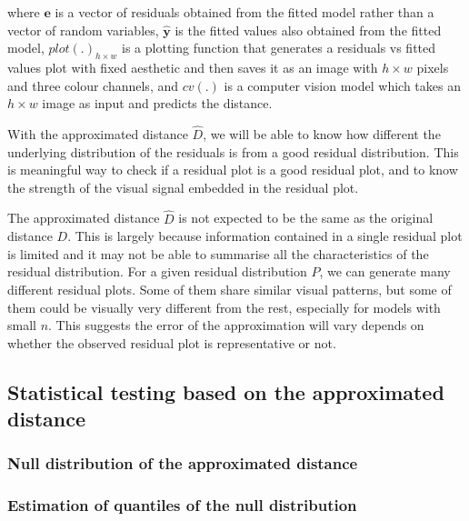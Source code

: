 \documentclass[]{interact}
\theoremstyle{plain}%
\theoremstyle{definition}
\theoremstyle{remark}
\begin{document}
\noindent where \(\boldsymbol{e}\) is a vector of residuals obtained
from the fitted model rather than a vector of random variables,
\(\hat{\boldsymbol{y}}\) is the fitted values also obtained from the
fitted model, \(plot(.)_{h \times w}\) is a plotting function that
generates a residuals vs fitted values plot with fixed aesthetic and
then saves it as an image with \(h \times w\) pixels and three colour
channels, and \(cv(.)\) is a computer vision model which takes an
\(h \times w\) image as input and predicts the distance.

With the approximated distance \(\hat{D}\), we will be able to know how
different the underlying distribution of the residuals is from a good
residual distribution. This is meaningful way to check if a residual
plot is a good residual plot, and to know the strength of the visual
signal embedded in the residual plot.

The approximated distance \(\hat{D}\) is not expected to be the same as
the original distance \(D\). This is largely because information
contained in a single residual plot is limited and it may not be able to
summarise all the characteristics of the residual distribution. For a
given residual distribution \(P\), we can generate many different
residual plots. Some of them share similar visual patterns, but some of
them could be visually very different from the rest, especially for
models with small \(n\). This suggests the error of the approximation
will vary depends on whether the observed residual plot is
representative or not.

\hypertarget{statistical-testing-based-on-the-approximated-distance}{%
\subsection{Statistical testing based on the approximated
distance}\label{statistical-testing-based-on-the-approximated-distance}}

\hypertarget{null-distribution-of-the-approximated-distance}{%
\subsubsection{Null distribution of the approximated
distance}\label{null-distribution-of-the-approximated-distance}}

\hypertarget{estimation-of-quantiles-of-the-null-distribution}{%
\subsubsection{Estimation of quantiles of the null
distribution}\label{estimation-of-quantiles-of-the-null-distribution}}
\end{document}
